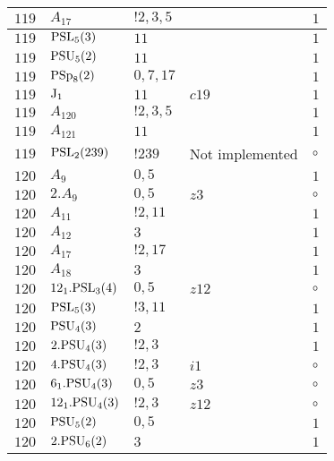 \documentclass[a4paper, 11pt]{article}
\begin{document}
\begin{longtable}{lllll}
        $ 119 $ & $ A_{17} $ & $ ! 2,3,5 $ & $ ~ $ & $ 1$ \\ \hline
        $ 119 $ & $ {\rm PSL}_{5}(3) $ & $ 11 $ & $ ~ $ & $ 1$ \\ \hline
        $ 119 $ & $ {\rm PSU}_{5}(2) $ & $ 11 $ & $ ~ $ & $ 1$ \\ \hline
        $ 119 $ & $ {\rm PSp}_{8}(2) $ & $ 0,7,17 $ & $ ~ $ & $ 1$ \\ \hline
        $ 119 $ & $ {\rm J}_1 $ & $ 11 $ & $ c19 $ & $ 1$ \\ \hline
        $ 119 $ & $ A_{120} $ & $ !2, 3, 5 $ & $ ~ $ & $ 1$ \\ \hline
        $ 119 $ & $ A_{121} $ & $ 11 $ & $ ~ $ & $ 1$ \\ \hline
        $ 119 $ & $ {\rm PSL}_{2}(239) $ & $ !239 $ &  Not implemented &  $\circ$ \\ \hline
        $ 120 $ & $ A_{9} $ & $ 0,5 $ & $ ~ $ & $ 1$ \\ \hline
        $ 120 $ & $ 2.A_{9} $ & $ 0,5 $ & $ z3 $ &  $\circ$ \\ \hline
        $ 120 $ & $ A_{11} $ & $ ! 2,11 $ & $ ~ $ & $ 1$ \\ \hline
        $ 120 $ & $ A_{12} $ & $ 3 $ & $ ~ $ & $ 1$ \\ \hline
        $ 120 $ & $ A_{17} $ & $ ! 2,17 $ & $ ~ $ & $ 1$ \\ \hline
        $ 120 $ & $ A_{18} $ & $ 3 $ & $ ~ $ & $ 1$ \\ \hline
        $ 120 $ & $ 12_1.{\rm PSL}_{3}(4) $ & $ 0,5 $ & $ z12 $ &  $\circ$ \\ \hline
        $ 120 $ & $ {\rm PSL}_{5}(3) $ & $ ! 3,11 $ & $ ~ $ & $ 1$ \\ \hline
        $ 120 $ & $ {\rm PSU}_{4}(3) $ & $ 2 $ & $ ~ $ & $ 1$ \\ \hline
        $ 120 $ & $ 2.{\rm PSU}_{4}(3) $ & $ ! 2,3 $ & $ ~ $ & $ 1$ \\ \hline
        $ 120 $ & $ 4.{\rm PSU}_{4}(3) $ & $ ! 2,3 $ & $ i1 $ &  $\circ$ \\ \hline
        $ 120 $ & $ 6_1.{\rm PSU}_{4}(3) $ & $ 0,5 $ & $ z3 $ &  $\circ$ \\ \hline
        $ 120 $ & $ 12_1.{\rm PSU}_{4}(3) $ & $ ! 2,3 $ & $ z12 $ &  $\circ$ \\ \hline
        $ 120 $ & $ {\rm PSU}_{5}(2) $ & $ 0,5 $ & $ ~ $ & $ 1$ \\ \hline
        $ 120 $ & $ 2.{\rm PSU}_{6}(2) $ & $ 3 $ & $ ~ $ & $ 1$ \\ \hline

\end{longtable}
\end{document}
